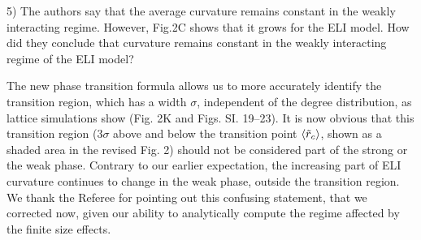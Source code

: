\documentclass[11pt]{article}
\newcommand{\outNim}[1]{}
\begin{document}
\begin{response}{
5) The authors say that the average curvature remains constant in the weakly interacting regime. However, Fig.2C shows that it grows for the ELI model. How did they conclude that curvature remains constant in the weakly interacting regime of the ELI model?
}

The new phase transition formula allows us to more accurately identify the transition region, which has a width $\sigma$, independent of the degree distribution, as lattice simulations show (Fig. 2K and Figs. SI. 19--23). 
It is now obvious that this transition region
($3\sigma$ above and below the transition point $\be{\tilde{r}_c}$, shown as a shaded area in the revised Fig. 2) should not be
considered part of the strong or the weak phase. Contrary to our earlier expectation, the increasing
part of ELI curvature continues to change in the weak phase, outside the transition region. 
We thank the Referee for pointing out this confusing statement, that we corrected now, given
our ability to analytically compute the regime affected by the finite size effects.

\outNim{ 
Upon more careful analysis, we now believe that the second order-like phase transition we observe is actually a glass transition \cite{gibbs1958nature} (SI 10.D).
The main feature of a glass transition is that it is not sharp, occurring smoothly over a range of temperatures (i.e. $r_L/r_N$). 
The width of the region is approximated well by the width $\sigma$ of a logistic or error function fit to the order parameter. 

The new phase transition formula allows us to more accurately identify the transition region and to predict and measure the fluctuations $\sigma = STD[\tilde{r}_c(k)]$. 
It is now obvious that this transition region ($3\sigma$ above and below the mean $\be{\tilde{r}_c}$, shown as a shaded area in the revised Fig. 2) should not be considered part of the strong or the weak phase.
Contrary to our earlier expectation, the increasing part of ELI curvature continues to change in the weak phase, outside the transition region. 
So our earlier statement was incorrect. 
Glass transition would also be consistent with the fact that our networks behave like gels in the strong phase, and like amorphous solids (glass) in the weak phase.
}%


\end{response}
\end{document}
